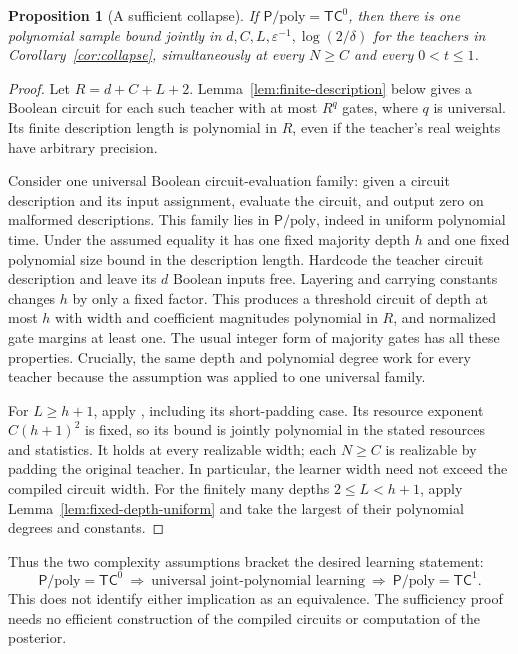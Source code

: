 \documentclass[11pt]{article}
\newtheorem{proposition}[theorem]{Proposition}
\theoremstyle{remark}
\newcommand{\TC}{\mathsf{TC}}
\newcommand{\Ppoly}{\mathsf{P}/\mathrm{poly}}
\begin{document}
\begin{proposition}[A sufficient collapse]
\label{prop:tc0-sufficient}
If $\Ppoly=\TC^0$, then there is one polynomial sample bound
jointly in $d,C,L,\varepsilon^{-1},\log(2/\delta)$ for the
teachers in Corollary~\ref{cor:collapse}, simultaneously
at every $N\ge C$ and every $0<t\le1$.
\end{proposition}
\begin{proof}
Let $R=d+C+L+2$. Lemma~\ref{lem:finite-description} below
gives a Boolean circuit for each such teacher with at most
$R^q$ gates, where $q$ is universal. Its finite description
length is polynomial in $R$, even if the teacher's real
weights have arbitrary precision.

Consider one universal Boolean circuit-evaluation family:
given a circuit description and its input assignment,
evaluate the circuit, and output zero on malformed
descriptions. This family lies in $\Ppoly$, indeed in
uniform polynomial time. Under the assumed equality it
has one fixed majority depth $h$ and one fixed polynomial
size bound in the description length. Hardcode the
teacher circuit description and leave its $d$ Boolean
inputs free. Layering and carrying constants changes $h$
by only a fixed factor. This produces a threshold circuit
of depth at most $h$ with width and coefficient magnitudes
polynomial in $R$, and normalized gate margins at least
one. The usual integer form of majority gates has all
these properties. Crucially, the same depth and polynomial
degree work for every teacher because the assumption was
applied to one universal family.

For $L\ge h+1$, apply
\cite[Theorem \texttt{thm:threshold}]{uniformtargets},
including its short-padding case. Its resource exponent
$C(h+1)^2$ is fixed, so its bound is jointly polynomial
in the stated resources and statistics.
It holds at every realizable width; each $N\ge C$ is
realizable by padding the original teacher. In particular,
the learner width need not exceed the compiled circuit
width. For the finitely many depths $2\le L<h+1$, apply
Lemma~\ref{lem:fixed-depth-uniform} and take the largest
of their polynomial degrees and constants.
\end{proof}

Thus the two complexity assumptions bracket the desired
learning statement:
\[
 \Ppoly=\TC^0
 \ \Longrightarrow\
 \text{universal joint-polynomial learning}
 \ \Longrightarrow\
 \Ppoly=\TC^1.
\]
This does not identify either implication as an equivalence.
The sufficiency proof needs no efficient construction of the
compiled circuits or computation of the posterior.
\end{document}
